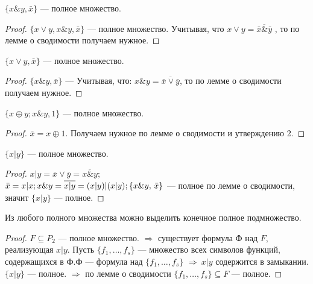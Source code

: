 \begin{statement}
$	\{x\&y, \bar{x} \}$ --- полное множество. 
\end{statement}
\begin{proof}
			$\{x\vee y, x \& y, \bar{x} \}$ --- полное множество. Учитывая, что $x \vee y = \overline{\bar{x}\&\bar{y} } $ , то по лемме о сводимости получаем нужное. \end{proof}	
\begin{statement}
	$\{x \vee y, \bar{x} \}$ --- полное множество.  
\end{statement}
\begin{proof}
	$	\{x\&y, \bar{x} \}$ ---   Учитывая, что: $x \& y =  \overline{\bar{x}\vee\bar{y} }$, то по лемме о сводимости получаем нужное.
\end{proof}
\begin{statement} 
$\{x \oplus y; x \& y, 1\}$ --- полное множество.
\end{statement}
\begin{proof}
	$\bar{x}=x \oplus 1. $ Получаем нужное по лемме о сводимости и утверждению 2.
\end{proof}	
\begin{statement}
	$\{x | y\}$ --- полное множество. 
\end{statement}
\begin{proof}
	$x|y=\bar{x} \vee \bar{y}=\overline{x \& y};$ \\
	$\bar{x}=x | x; \\
	x \& y=\overline{x|y}=(x|y)|(x|y); \\
	\{x \& y,\, \bar{x}\}$ --- полное по лемме о сводимости, значит $\{x|y\}$ --- полное.   
\end{proof}
\begin{corollary}
	Из любого полного множества можно выделить конечное полное подмножество.
\end{corollary}
\begin{proof}
	$F\subseteq P_2$ --- полное множество. $\Rightarrow$ существует формула Ф над $F$, реализующая ${x|y}$. Пусть $\{f_1, \ldots, f_s\}$ --- множество всех символов функций, содержащихся в Ф.Ф --- формула над $\{f_1, \ldots, f_s\}$ $\Rightarrow  ~ x|y$ содержится в замыкании. $\{x|y\}$ --- полное. $\Rightarrow$ по лемме о сводимости $\{f_1, \ldots, f_s\} \subseteq F$ --- полное.
\end{proof}  